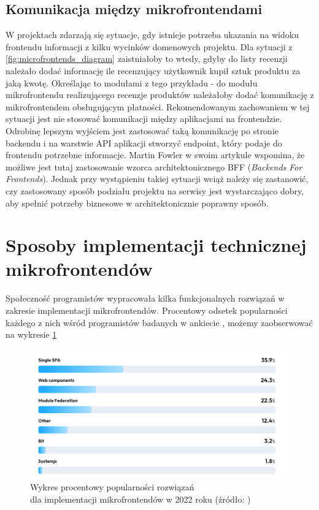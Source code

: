 \documentclass{SGGW-thesis}
\begin{document}
    \subsection{Komunikacja między mikrofrontendami}
    W projektach zdarzają się sytuacje, gdy istnieje potrzeba ukazania na widoku frontendu informacji z kilku wycinków domenowych projektu. Dla sytuacji z  \cref{fig:microfrontends_diagram} zaistniałoby to wtedy, gdyby do listy recenzji należało dodać informację ile recenzujący użytkownik kupił sztuk produktu za jaką kwotę. Określając to modułami z tego przykładu - do modułu mikrofrontendu realizującego recenzje produktów należałoby dodać komunikację z mikrofrontendem obsługującym płatności. Rekomendowanym  zachowaniem w tej sytuacji jest nie stosować komunikacji między aplikacjami na frontendzie. Odrobinę lepszym wyjściem jest zastosować taką komunikację po stronie backendu i na warstwie API aplikacji stworzyć endpoint, który podaje do frontendu potrzebne informacje. Martin Fowler w swoim artykule \cite{fowler_2019} wspomina, że możliwe jest tutaj zastosowanie wzorca architektonicznego BFF (\textit{Backends For Frontends}). Jednak przy wystąpieniu takiej sytuacji wciąż należy się zastanowić, czy zastosowany sposób podziału projektu na serwisy jest wystarczająco dobry, aby spełnić potrzeby biznesowe w architektonicznie poprawny sposób.

  \section{Sposoby implementacji technicznej mikrofrontendów}
  Społeczność programistów wypracowała kilka funkcjonalnych rozwiązań w zakresie implementacji mikrofrontendów. Procentowy odsetek popularności każdego z nich wśród programistów badanych w ankiecie \cite{tsh_2022}, możemy zaobserwować na wykresie \cref{fig:tsh_frontend_implementations}

  \vfill
  \clearpage
  
  \begin{figure}[h]
    \centering
    \captionsetup{justification=centering}
    \includegraphics[width=\textwidth]{frontend_implementations_by_percent.png}
    \caption[Wykres procentowy popularności rozwiązań dla implementacji mikrofrontendów w 2022 roku]{Wykres procentowy popularności rozwiązań \\ dla implementacji mikrofrontendów w 2022 roku (źródło: \cite{tsh_2022})}
    \label{fig:tsh_frontend_implementations}
  \end{figure}
\end{document}

